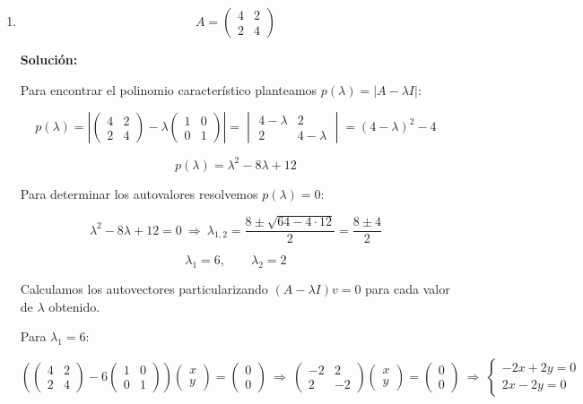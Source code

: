 \documentclass[12pt]{article}
\newcommand{\solucion}{%
    \vspace{0.8em}%
    \textbf{Solución:}%
    \vspace{0.8em}%
}
\begin{document}
\begin{enumerate}[label=\alph*.-]

    \item
    \[
    A=\begin{pmatrix}4&2\\2&4\end{pmatrix}
    \]

    \solucion

    Para encontrar el polinomio característico planteamos
    $p(\lambda)=|A-\lambda I|$:

    \[
    p(\lambda)=\left|\begin{pmatrix}4&2\\2&4\end{pmatrix}
    -\lambda\begin{pmatrix}1&0\\0&1\end{pmatrix}\right|
    =\begin{vmatrix}4-\lambda&2\\2&4-\lambda\end{vmatrix}
    =(4-\lambda)^2-4
    \]

    \[
    \boxed{p(\lambda)=\lambda^2-8\lambda+12}
    \]

    Para determinar los autovalores resolvemos $p(\lambda)=0$:

    \[
    \lambda^2-8\lambda+12=0\ \Rightarrow\
    \lambda_{1,2}=\frac{8\pm\sqrt{64-4\cdot12}}{2}=\frac{8\pm4}{2}
    \]

    \[
    \boxed{\lambda_1=6,\qquad \lambda_2=2}
    \]

    Calculamos los autovectores particularizando $(A-\lambda I)v=0$
    para cada valor de $\lambda$ obtenido.

    Para $\lambda_1=6$:

    \[
    \left(\begin{pmatrix}4&2\\2&4\end{pmatrix}-6\begin{pmatrix}1&0\\0&1\end{pmatrix}\right)
    \begin{pmatrix}x\\y\end{pmatrix}=\begin{pmatrix}0\\0\end{pmatrix}
    \ \Rightarrow\
    \begin{pmatrix}-2&2\\2&-2\end{pmatrix}\begin{pmatrix}x\\y\end{pmatrix}=\begin{pmatrix}0\\0\end{pmatrix}
    \ \Rightarrow\
    \begin{cases}-2x+2y=0\\2x-2y=0\end{cases}
    \]


\end{enumerate}
\end{document}
